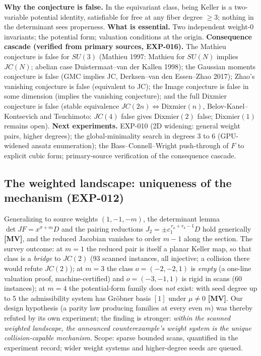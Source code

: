 \documentclass[11pt]{article}
\theoremstyle{definition}
\theoremstyle{remark}
\newcommand{\detJ}{\det JF}
\begin{document}
\textbf{Why the conjecture is false.} In the equivariant class, being Keller is a two-variable
potential identity, satisfiable for free at any fiber degree $\ge 3$; nothing in the
determinant sees properness. \textbf{What is essential.} Two independent weight-0 invariants;
the potential form; valuation conditions at the origin. \textbf{Consequence cascade
(verified from primary sources, EXP-016).} The Mathieu conjecture is false for $SU(3)$ (Mathieu
1997: Mathieu for $SU(N)$ implies $JC(N)$; abelian case Duistermaat--van der Kallen 1998); the
Gaussian moments conjecture is false (GMC implies JC, Derksen--van den Essen--Zhao 2017); Zhao's
vanishing conjecture is false (equivalent to JC); the Image conjecture is false in some
dimension (implies the vanishing conjecture); and the full Dixmier conjecture is false (stable
equivalence $JC(2n) \Leftrightarrow \mathrm{Dixmier}(n)$, Belov-Kanel--Kontsevich and
Tsuchimoto: $JC(4)$ false gives $\mathrm{Dixmier}(2)$ false; $\mathrm{Dixmier}(1)$ remains
open). \textbf{Next experiments.} EXP-010 (2D widening:
general weight pairs, higher degrees); the global-minimality search in degrees 3 to 6
(GPU-widened ansatz enumeration); the Bass--Connell--Wright push-through of $F$ to explicit
cubic form; primary-source verification of the consequence cascade.


\subsection*{The weighted landscape: uniqueness of the mechanism (EXP-012)}
Generalizing to source weights $(1, -1, -m)$, the determinant lemma
$\detJ = x^{\sigma+m} D$ and the pairing reductions $J_2 = \pm c_1^{\,r_a+r_b-1} D$ hold
generically \textbf{[MV]}, and the reduced Jacobian vanishes to order $m-1$ along the section.
The survey outcome: at $m = 1$ the reduced pair is itself a planar Keller map, so that class is
a \emph{bridge} to $JC(2)$ (93 scanned instances, all injective; a collision there would refute
$JC(2)$); at $m = 3$ the class $o = (-2,-2,1)$ is \emph{empty} (a one-line valuation proof,
machine-certified) and $o = (-3,-1,1)$ is rigid in scans (60 instances); at $m = 4$ the
potential-form family does \emph{not} exist: with seed degree up to 5 the admissibility system
has Gr\"obner basis $[1]$ under $\mu \ne 0$ \textbf{[MV]}. Our design hypothesis (a parity law
producing families at every even $m$) was thereby refuted by its own experiment; the finding is
stronger: \emph{within the scanned weighted landscape, the announced counterexample's weight
system is the unique collision-capable mechanism}. Scope: sparse bounded scans, quantified in
the experiment record; wider weight systems and higher-degree seeds are queued.
\end{document}
